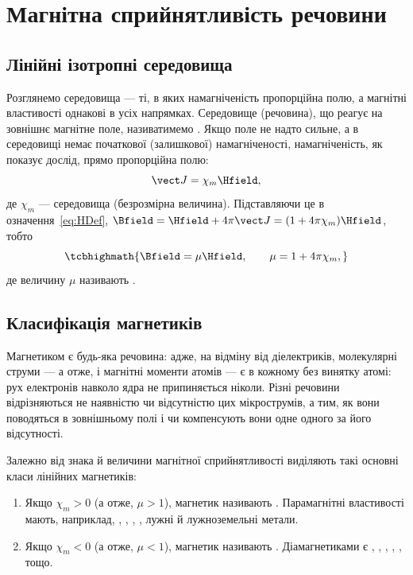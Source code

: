 \section{Магнітна сприйнятливість речовини}

\subsection*{Лінійні ізотропні середовища}

Розглянемо  середовища --- ті, в яких
намагніченість пропорційна полю, а магнітні властивості однакові в усіх
напрямках. Середовище (речовина), що реагує на зовнішнє магнітне поле, називатимемо
. Якщо поле не надто сильне, а в середовищі немає
початкової (залишкової) намагніченості, намагніченість, як показує дослід,
прямо пропорційна полю:
\begin{equation}\label{eq:LinearMedium}
	\vect J = \chi_m\Hfield,
\end{equation}
де $\chi_m$ ---  середовища (безрозмірна
величина). Підставляючи це в означення~\eqref{eq:HDef},
$\Bfield = \Hfield + 4\pi\vect J = (1+4\pi\chi_m)\Hfield$, тобто
\begin{equation}\label{eq:BMuH}
	\tcbhighmath{
		\Bfield = \mu\Hfield, \qquad \mu = 1+4\pi\chi_m,
	}
\end{equation}
де величину $\mu$ називають .

\subsection*{Класифікація магнетиків}

Магнетиком є будь-яка речовина: адже, на відміну від діелектриків,
молекулярні струми --- а отже, і магнітні моменти атомів --- є в кожному
без винятку атомі: рух електронів навколо ядра не припиняється ніколи.
Різні речовини відрізняються не наявністю чи відсутністю цих мікрострумів,
а тим, як вони поводяться в зовнішньому полі і чи компенсують вони одне
одного за його відсутності.

Залежно від знака й величини магнітної сприйнятливості виділяють такі
основні класи лінійних магнетиків:
\begin{enumerate}
	\item Якщо $\chi_m > 0$ (а отже, $\mu>1$), магнетик називають
	      . Парамагнітні властивості мають, наприклад,
	      , , , , лужні й лужноземельні метали.
	\item Якщо $\chi_m < 0$ (а отже, $\mu<1$), магнетик називають
	      . Діамагнетиками є , , ,
	      , ,  тощо.
\end{enumerate}

